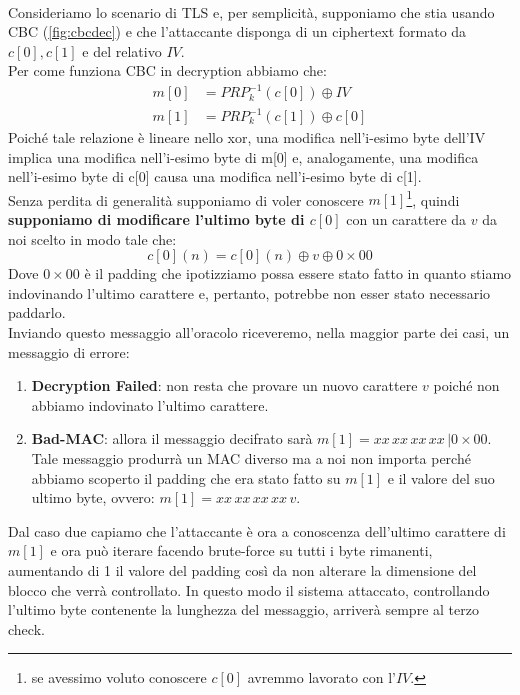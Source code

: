 \begin{example}\label{exam:padoracle}\hfill\\
Consideriamo lo scenario di TLS e, per semplicità, supponiamo che stia usando CBC (\cref{fig:cbcdec}) e che l'attaccante disponga di un ciphertext formato da $c[0],c[1]$ e del relativo $IV$.\\ 
Per come funziona CBC in decryption abbiamo che:
\begin{equation*}
    \begin{aligned}
    m[0] &= {PRP}^{-1}_k(c[0])\oplus{IV}\\
    m[1] &= {PRP}^{-1}_k(c[1])\oplus{c[0]}
    \end{aligned}
\end{equation*}
Poiché tale relazione è lineare nello xor, una modifica nell'i-esimo byte dell'IV implica una modifica nell'i-esimo byte di m[0] e, analogamente, una modifica nell'i-esimo byte di c[0] causa una modifica nell'i-esimo byte di c[1].\\
Senza perdita di generalità supponiamo di voler conoscere $m[1]$\footnote{se avessimo voluto conoscere $c[0]$ avremmo lavorato con l'$IV$.}, quindi \textbf{supponiamo di modificare l'ultimo byte di $c[0]$} con un carattere da $v$ da noi scelto in modo tale che:
\[c[0](n) = c[0](n)\oplus{v}\oplus{0\times00}\]
Dove $0\times00$ è il padding che ipotizziamo possa essere stato fatto in quanto stiamo indovinando l'ultimo carattere e, pertanto, potrebbe non esser stato necessario paddarlo.\\
Inviando questo messaggio all'oracolo riceveremo, nella maggior parte dei casi, un messaggio di errore:
\begin{enumerate}
    \item \textbf{Decryption Failed}: non resta che provare un nuovo carattere $v$ poiché non abbiamo indovinato l'ultimo carattere.
    \item \textbf{Bad-MAC}: allora il messaggio decifrato sarà $m[1] = xx\,xx\,xx\,xx\,|0\times00$. Tale messaggio produrrà un MAC diverso ma a noi non importa perché abbiamo scoperto il padding che era stato fatto su $m[1]$ e il valore del suo ultimo byte, ovvero: $m[1]=xx\,xx\,xx\,xx\,v$.
\end{enumerate}
Dal caso due capiamo che l'attaccante è ora a conoscenza dell'ultimo carattere di $m[1]$ e ora può iterare facendo brute-force su tutti i byte rimanenti, aumentando di 1 il valore del padding così da non alterare la dimensione del blocco che verrà controllato. In questo modo il sistema attaccato, controllando l'ultimo byte contenente la lunghezza del messaggio, arriverà sempre al terzo check. 

\end{example}

